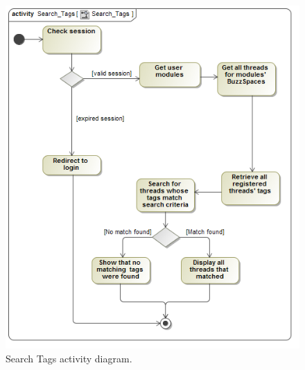 \documentclass [a4paper,12pt] {article}
\begin{document}
			\begin{figure}[H]
				\centering
				\includegraphics[width=1.0\textwidth]{SearchTagsAD.png}
				\caption{Search Tags activity diagram.}
			\end{figure}
\end{document}
